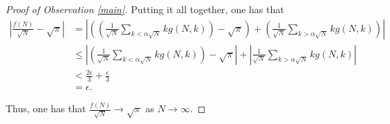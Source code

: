 \documentclass[11pt]{article}
\theoremstyle{definition}
\begin{document}
\begin{proof}[Proof of Observation \ref{main}]
Putting it all together, one has that 
\begin{align*}
\left|\frac{f(N)}{\sqrt{N}}-\sqrt{\pi}\right| & = \left| \left(\left(\frac{1}{\sqrt{N}}\sum_{k<\alpha\sqrt{N}}kg(N,k)\right) - \sqrt{\pi}\right) + \left(\frac{1}{\sqrt{N}}\sum_{k>\alpha\sqrt{N}} kg(N,k)\right)\right| \\
& \leq \left|\left(\frac{1}{\sqrt{N}}\sum_{k<\alpha\sqrt{N}}kg(N,k)\right) - \sqrt{\pi}\right| + \left|\frac{1}{\sqrt{N}}\sum_{k>\alpha\sqrt{N}} kg(N,k)\right| \\
& < \frac{2\epsilon}{3} + \frac{\epsilon}{3}\\
& = \epsilon.
\end{align*}

Thus, one has that $\frac{f(N)}{\sqrt{N}} \rightarrow \sqrt{\pi}$ as $N \rightarrow \infty$.
\end{proof}
\end{document}
